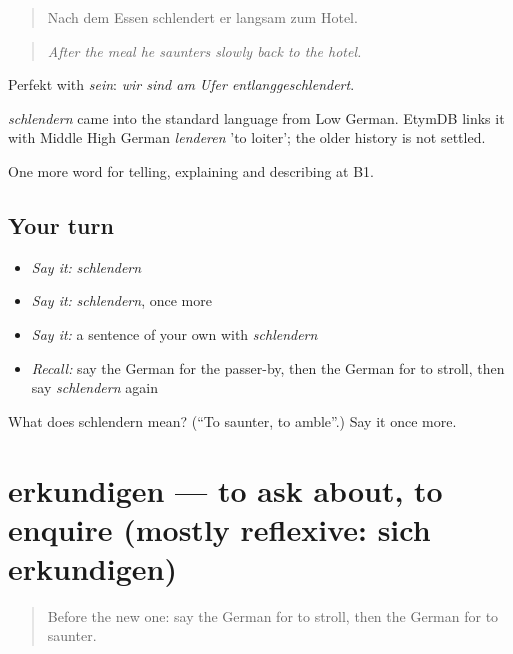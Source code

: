 \begin{quote}
Nach dem Essen schlendert er langsam zum Hotel.
\end{quote}

\begin{quote}
\emph{After the meal he saunters slowly back to the hotel.}
\end{quote}

Perfekt with \emph{sein}: \emph{wir sind am Ufer entlanggeschlendert}.

\begin{cousinweb}
\emph{schlendern} came into the standard language from Low German. EtymDB links it with Middle High German \emph{lenderen} 'to loiter'; the older history is not settled.
\end{cousinweb}

\begin{grammarlens}[title={What you've built}]
One more word for telling, explaining and describing at B1.
\end{grammarlens}

\subsection*{Your turn}
\begin{itemize}
\raggedright
  \item \emph{Say it:} \emph{schlendern}
  \item \emph{Say it:} \emph{schlendern}, once more
  \item \emph{Say it:} a sentence of your own with \emph{schlendern}
  \item \emph{Recall:} say the German for the passer-by, then the German for to stroll, then say \emph{schlendern} again
\end{itemize}

\begin{tcolorbox}[breakable,colback=teal!4,colframe=teal!35!black,title={Before you move on}]
What does schlendern mean? (\textquotedblleft{}To saunter, to amble\textquotedblright{}.) Say it once more.
\end{tcolorbox}
\section[erkundigen]{erkundigen — to ask about, to enquire (mostly reflexive: sich erkundigen)}

\label{lesson:GE-C437-erkundigen}



\begin{quote}
Before the new one: say the German for to stroll, then the German for to saunter.
\end{quote}

